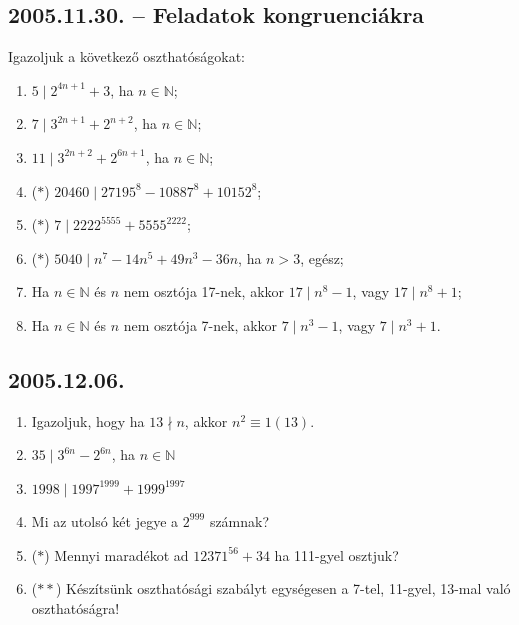 \documentclass{article}
\begin{document}
\subsection*{2005.11.30. -- Feladatok kongruenciákra}
Igazoljuk a következő oszthatóságokat:

\begin{enumerate} 

\item $5\mid 2^{4n+1}+3$, ha $n\in \mathbb{N}$;
\item $7\mid  3^{2n+1}+2^{n+2}$, ha $n\in \mathbb{N}$;
\item $11\mid  3^{2n+2}+2^{6n+1}$, ha $n\in \mathbb{N}$;
\item ($*$) $20460\mid  27195^8-10887^8+10152^8$;
\item ($*$) $7 \mid  2222^{5555}+5555^{2222}$;
\item ($*$) $5040 \mid  n^7-14n^5+49n^3-36n$, ha $n>3$, egész;
\item Ha $n\in \mathbb{N}$ és $n$ nem osztója 17-nek, akkor $17\mid  n^8-1$, vagy $17 \mid  n^8+1$;
\item Ha $n\in \mathbb{N}$ és $n$ nem osztója 7-nek, akkor $7\mid  n^3-1$, vagy $7 \mid n^3+1$.

\end{enumerate}

\subsection*{2005.12.06.}
\begin{enumerate}
\item Igazoljuk, hogy ha $13\nmid n$, akkor
$n^2\equiv 1 (13)$.
\item $35\mid 3^{6n}-2^{6n}$, ha $n\in \mathbb{N}$
\item $1998\mid 1997^{1999}+1999^{1997}$
\item Mi az utolsó két jegye a $2^{999}$ számnak?
\item ($*$) Mennyi maradékot ad $12371^{56}+34$ ha 111-gyel osztjuk?
\item ($**$) Készítsünk oszthatósági szabályt egységesen a 7-tel, 11-gyel, 13-mal való oszthatóságra!
\end{enumerate}
\end{document}
